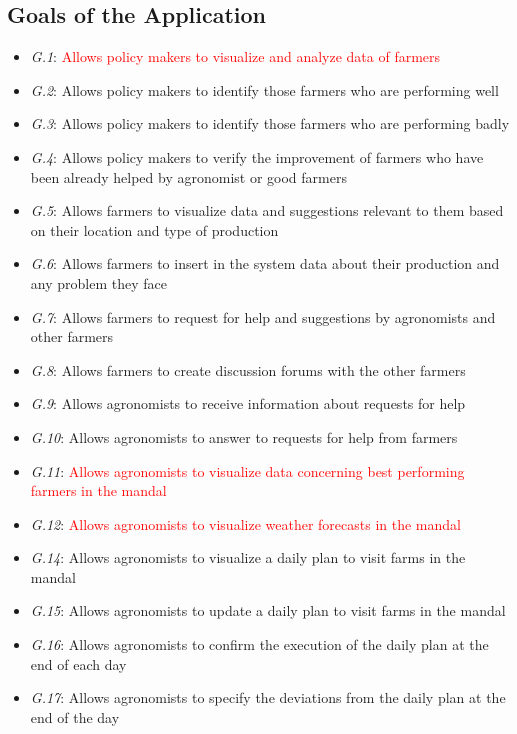 \subsection{Goals of the Application}
\begin{itemize}
    \item \textit {G.1}: \textcolor{red}{Allows policy makers to visualize and analyze data of farmers}
    \item \textit {G.2}: Allows policy makers to identify those farmers who are performing well
    \item \textit {G.3}: Allows policy makers to identify those farmers who are performing badly
    \item \textit {G.4}: Allows policy makers to verify the improvement of farmers who have been already helped by agronomist or good farmers
    \item \textit {G.5}: Allows farmers to visualize data and suggestions relevant to them based on their location and type of production
    \item \textit {G.6}: Allows farmers to insert in the system data about their production and any problem they face
    \item \textit {G.7}: Allows farmers to request for help and suggestions by agronomists and other farmers
    \item \textit {G.8}: Allows farmers to create discussion forums with the other farmers
    \item \textit {G.9}: {\color{orange}  Allows agronomists to receive information about requests for help}
    \item \textit {G.10}: Allows agronomists to answer to requests for help from farmers
    \item \textit {G.11}: \textcolor{red}{Allows agronomists to visualize data concerning best performing farmers in the mandal}
    \item \textit {G.12}: \textcolor{red}{Allows agronomists to visualize weather forecasts in the mandal}
    \item \textit {G.14}: Allows agronomists to visualize a daily plan to visit farms in the mandal
    \item \textit {G.15}: Allows agronomists to update a daily plan to visit farms in the mandal
    \item \textit {G.16}: Allows agronomists to confirm the execution of the daily plan at the end of each day 
    \item \textit {G.17}: Allows agronomists to specify the deviations from the daily plan at the end of the day

\end{itemize}